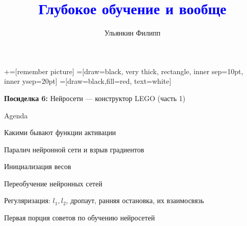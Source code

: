 \documentclass[notes,12pt, aspectratio=169]{beamer}
\title[]{\textcolor{blue}{Глубокое обучение и вообще}}
\author{Ульянкин Филипп}
\date{ }
\newenvironment{wideitemize}{\itemize\addtolength{\itemsep}{10pt}}{\enditemize}
\begin{document}
\newcommand\marktopleft[1]{%
    \tikz[overlay,remember picture] 
        \node (marker-#1-a) at (-.3em,.3em) {};%
}
\newcommand\markbottomright[2]{%
    \tikz[overlay,remember picture] 
        \node (marker-#1-b) at (0em,0em) {};%
}
+=[remember picture] 
 =[draw=black, very thick, rectangle, inner sep=10pt, inner ysep=20pt]
 =[draw=black,fill=red, text=white]



\begin{frame}
\maketitle
\centering \textbf{\color{blue} Посиделка 6:}  Нейросети — конструктор LEGO (часть 1)
\end{frame}


\begin{frame}{Agenda}
\begin{wideitemize}
	\item  Какими бывают функции активации
	\item  Паралич  нейронной сети и взрыв градиентов 
	\item  Инициализация весов 
	\item  Переобучение нейронных сетей
	\item  Регуляризация: $l_1, l_2$, дропаут, ранняя остановка, их взаимосвязь
	\item  Первая порция советов по обучению нейросетей 	
\end{wideitemize} 
\end{frame}
\end{document}
